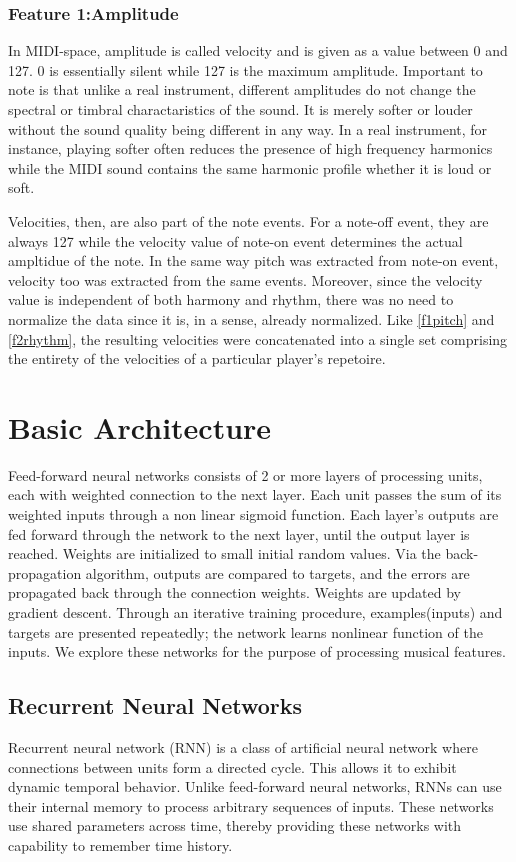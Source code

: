 \documentclass[conference]{IEEEtran}
\begin{document}
\subsubsection{Feature 1:Amplitude} \label{f3amplitude}
In MIDI-space, amplitude is called velocity and is given as a value between 0 and 127. 0 is essentially silent while 127 is the maximum amplitude. Important to note is that unlike a real instrument, different amplitudes do not change the spectral or timbral charactaristics of the sound. It is merely softer or louder without the sound quality being different in any way. In a real instrument, for instance, playing softer often reduces the presence of high frequency harmonics while the MIDI sound contains the same harmonic profile whether it is loud or soft.

Velocities, then, are also part of the note events. For a note-off event, they are always 127 while the velocity value of note-on event determines the actual ampltidue of the note. In the same way pitch was extracted from note-on event, velocity too was extracted from the same events. Moreover, since the velocity value is independent of both harmony and rhythm, there was no need to normalize the data since it is, in a sense, already normalized. Like \ref{f1pitch} and \ref{f2rhythm}, the resulting velocities were concatenated into a single set comprising the entirety of the velocities of a particular player's repetoire.

\section{Basic Architecture}
Feed-forward neural networks consists of 2 or more layers of processing units, each with weighted connection to the next layer. Each unit passes the sum of its weighted inputs through a non linear sigmoid function. Each layer's outputs are fed forward through the network to the next layer, until the output layer is reached. Weights are initialized to small initial random values. Via the back-propagation algorithm, outputs are compared to targets, and the errors are propagated back through the connection weights. Weights are updated by gradient descent. Through an iterative training procedure, examples(inputs) and targets are presented repeatedly; the network learns nonlinear function of the inputs. We explore these networks for the purpose of processing musical features.\cite{judy1}

\subsection{Recurrent Neural Networks}
Recurrent neural network (RNN) is a class of artificial neural network where connections between units form a directed cycle. This allows it to exhibit dynamic temporal behavior. Unlike feed-forward neural networks, RNNs can use their internal memory to process arbitrary sequences of inputs. These networks use shared parameters across time, thereby providing these networks with capability to remember time history.\\
\end{document}

